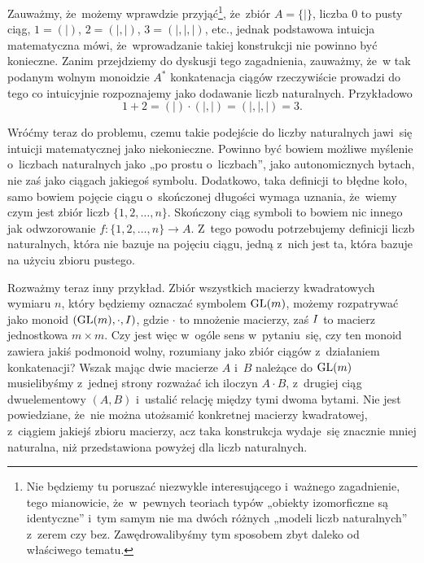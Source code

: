\documentclass[a4paper,11pt]{article}
\begin{document}
Zauważmy, że~możemy wprawdzie przyjąć\footnote{Nie będziemy tu
  poruszać niezwykle interesującego i~ważnego zagadnienie, tego
  mianowicie, że~w~pewnych teoriach typów „obiekty izomorficzne są
  identyczne” i~tym samym nie ma dwóch różnych „modeli liczb
  naturalnych” z~zerem czy bez. Zawędrowalibyśmy tym sposobem zbyt
  daleko od właściwego tematu.}, że~zbiór $A = \{ | \}$, liczba $0$ to
pusty ciąg, $1 = ( | )$, $2 = ( |, | )$, $3 = ( |, |, | )$, etc.,
jednak podstawowa intuicja matematyczna mówi, że~wprowadzanie takiej
konstrukcji nie powinno być konieczne. Zanim przejdziemy do dyskusji
tego zagadnienia, zauważmy, że~w tak podanym wolnym monoidzie
$A^{ * }$ konkatenacja ciągów rzeczywiście prowadzi do tego co
intuicyjnie rozpoznajemy jako dodawanie liczb naturalnych. Przykładowo
\begin{equation}
  \label{eq:Forys-Forys-04}
  1 + 2 = ( | ) \cdot ( |, | ) = ( |, |, | ) = 3.
\end{equation}

Wróćmy teraz do problemu, czemu takie podejście do liczby naturalnych
jawi~się intuicji matematycznej jako niekonieczne. Powinno być bowiem
możliwe myślenie o~liczbach naturalnych jako „po prostu o~liczbach”,
jako autonomicznych bytach, nie zaś jako ciągach jakiegoś symbolu.
Dodatkowo, taka definicji to błędne koło, samo bowiem pojęcie ciągu
o~skończonej długości wymaga uznania, że~wiemy czym jest zbiór liczb
$\{ 1, 2, \ldots, n \}$. Skończony ciąg symboli to bowiem nic innego jak
odwzorowanie $f : \{ 1, 2, \ldots, n \} \to A$. Z~tego powodu potrzebujemy
definicji liczb naturalnych, która nie bazuje na pojęciu ciągu, jedną
z~nich jest ta, która bazuje na użyciu zbioru pustego.

Rozważmy teraz inny przykład. Zbiór wszystkich macierzy kwadratowych
wymiaru $n$, który będziemy oznaczać symbolem $\mathrm{GL}( m )$, możemy
rozpatrywać jako monoid $( \mathrm{GL}( m ), \cdot, I )$, gdzie $\cdot$
to mnożenie macierzy, zaś $I$ to macierz jednostkowa
$m \times m$. Czy jest więc w~ogóle sens w~pytaniu~się, czy
ten monoid zawiera jakiś podmonoid wolny, rozumiany jako zbiór ciągów
z~działaniem konkatenacji? Wszak mając dwie macierze $A$ i~$B$
należące do $\mathrm{GL}( m )$ musielibyśmy z~jednej strony rozważać ich
iloczyn $A \cdot B$, z~drugiej ciąg dwuelementowy $( A, B )$ i~ustalić
relację między tymi dwoma bytami. Nie jest powiedziane, że~nie można
utożsamić konkretnej macierzy kwadratowej, z~ciągiem jakiejś zbioru
macierzy, acz taka konstrukcja wydaje~się znacznie mniej naturalna,
niż przedstawiona powyżej dla liczb naturalnych.
\end{document}
